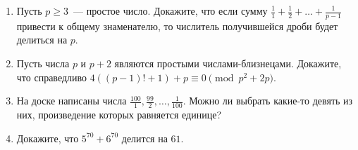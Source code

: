 \documentclass{article}
\begin{document}
\begin{enumerate}[label*=\protect\fbox{\arabic{enumi}}]
\item Пусть $p \geqslant 3$~--- простое число. Докажите, что если сумму $\frac{1}{1} + \frac{1}{2} + \ldots+\frac{1}{p-1}$ привести к общему знаменателю, то числитель получившейся дроби будет делиться на $p$.

\item Пусть числа $p$ и $p + 2$ являются простыми числами-близнецами. Докажите, 
что справедливо $4((p - 1)! + 1) + p \equiv 0 \pmod{p^2+2p}$.

\item  На доске написаны числа $\frac{100}{1}, \frac{99}{2}, \ldots, \frac{1}{100}$. Можно ли выбрать какие-то девять из них, произведение которых равняется единице?

\item Докажите, что $5^{70} + 6^{70}$ делится на $61$.


\end{enumerate}
\end{document}
